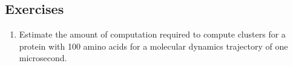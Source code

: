 \documentclass[book.tex]{subfiles}
\begin{document}
\subsection{Exercises}

\begin{enumerate}
    \item Estimate the amount of computation required to compute clusters for a protein with 100 amino acids for a molecular dynamics trajectory of one microsecond.
\end{enumerate}

\end{document}
